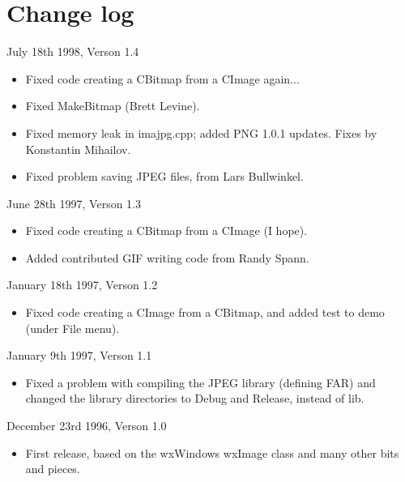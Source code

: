 \chapter{Change log}\label{changes}
%
\setfooter{\thepage}{}{}{}{}{\thepage}%

July 18th 1998, Verson 1.4

\begin{itemize}\itemsep=0pt
\item Fixed code creating a CBitmap from a CImage again...
\item Fixed MakeBitmap (Brett Levine).
\item Fixed memory leak in imajpg.cpp; added PNG 1.0.1 updates. Fixes by Konstantin Mihailov.
\item Fixed problem saving JPEG files, from Lars Bullwinkel.
\end{itemize}

June 28th 1997, Verson 1.3

\begin{itemize}\itemsep=0pt
\item Fixed code creating a CBitmap from a CImage (I hope).
\item Added contributed GIF writing code from Randy Spann.
\end{itemize}

January 18th 1997, Verson 1.2

\begin{itemize}\itemsep=0pt
\item Fixed code creating a CImage from a CBitmap, and added test to demo (under File menu).
\end{itemize}

January 9th 1997, Verson 1.1

\begin{itemize}\itemsep=0pt
\item Fixed a problem with compiling the JPEG library (defining FAR) and changed the
library directories to Debug and Release, instead of lib.
\end{itemize}

December 23rd 1996, Verson 1.0

\begin{itemize}\itemsep=0pt
\item First release, based on the wxWindows wxImage class and many other bits and pieces.
\end{itemize}






